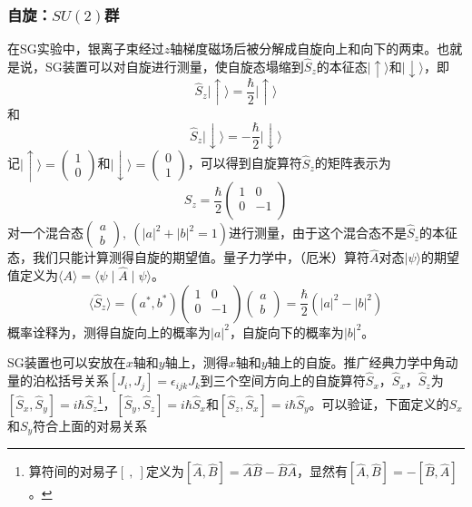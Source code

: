 \documentclass[a4paper,11pt]{ctexart}
\newcommand{\beq}{\begin{equation}}
\newcommand{\eeq}{\end{equation}}
\newcommand{\up}{\uparrow}
\newcommand{\down}{\downarrow}
\begin{document}
\subsubsection{自旋：$SU(2)$群}
在SG实验中，银离子束经过$z$轴梯度磁场后被分解成自旋向上和向下的两束。也就是说，SG装置可以对自旋进行测量，使自旋态塌缩到$\hat{S}_z$的本征态$\mid \up \rangle$和$\mid \down \rangle$，即
\beq
\hat{S}_z \mid \up \rangle = \frac{\hbar}{2} \mid \up \rangle
\eeq
和
\beq
\hat{S}_z \mid \down \rangle = -\frac{\hbar}{2} \mid \down \rangle
\eeq
记$\mid \up \rangle = \begin{pmatrix} 1 \\ 0 \end{pmatrix} $和$\mid \down \rangle = \begin{pmatrix} 0 \\ 1 \end{pmatrix} $，可以得到自旋算符$\hat{S}_z$的矩阵表示为
\beq
S_z = \frac{\hbar}{2} 
\begin{pmatrix}
 1 & 0 \\
 0 & -1 \\
\end{pmatrix}
\eeq
对一个混合态$\begin{pmatrix} a \\ b \end{pmatrix}, \ (|a|^2 + |b|^2 = 1)$进行测量，由于这个混合态不是$\hat{S}_z$的本征态，我们只能计算测得自旋的期望值。量子力学中，（厄米）算符$\hat{A}$对态$\mid \psi \rangle$的期望值定义为$\langle A \rangle = \langle \psi \mid \hat{A} \mid \psi \rangle$。
\beq
\langle \hat{S}_z \rangle = (a^*,b^*) \begin{pmatrix}
 1 & 0 \\
 0 & -1 \\
\end{pmatrix}
\begin{pmatrix} a \\ b \end{pmatrix}
= \frac{\hbar}{2} (|a|^2 - |b|^2)
\eeq
概率诠释为，测得自旋向上的概率为$|a|^2$，自旋向下的概率为$|b|^2$。\par
SG装置也可以安放在$x$轴和$y$轴上，测得$x$轴和$y$轴上的自旋。推广经典力学中角动量的泊松括号关系$[J_i,J_j] = \epsilon_{ijk} J_k$到三个空间方向上的自旋算符$\hat{S}_x$，$\hat{S}_x$，$\hat{S}_z$为$[\hat{S}_x,\hat{S}_y] = i\hbar \hat{S}_z$\footnote{算符间的对易子$[\ ,\ ]$定义为$[\hat{A},\hat{B}] = \hat{A} \hat{B} - \hat{B} \hat{A}$，显然有$[\hat{A},\hat{B}] = - [\hat{B},\hat{A}]$。}，$[\hat{S}_y,\hat{S}_z] = i\hbar \hat{S}_x$和$[\hat{S}_z,\hat{S}_x] = i\hbar \hat{S}_y$。可以验证，下面定义的$S_x$和$S_y$符合上面的对易关系
\end{document}
